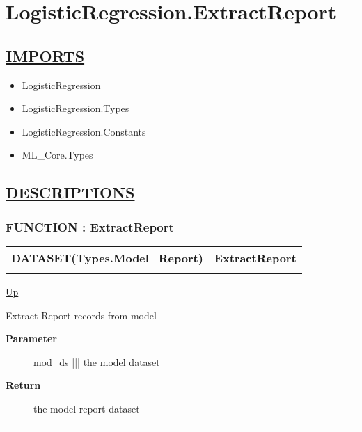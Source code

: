 \chapter*{LogisticRegression.ExtractReport}
\hypertarget{ecldoc:toc:LogisticRegression.ExtractReport}{}

\section*{\underline{IMPORTS}}
\begin{itemize}
\item LogisticRegression
\item LogisticRegression.Types
\item LogisticRegression.Constants
\item ML\_Core.Types
\end{itemize}

\section*{\underline{DESCRIPTIONS}}
\subsection*{FUNCTION : ExtractReport}
\hypertarget{ecldoc:logisticregression.extractreport}{}

{\renewcommand{\arraystretch}{1.5}
\begin{tabularx}{\textwidth}{|>{\raggedright\arraybackslash}l|X|}
\hline
\hspace{0pt}DATASET(Types.Model\_Report) & ExtractReport \\
\hline
\multicolumn{2}{|>{\raggedright\arraybackslash}X|}{\hspace{0pt}(DATASET(Core\_Types.Layout\_Model) mod\_ds)} \\
\hline
\end{tabularx}
}

\hyperlink{ecldoc:toc:LogisticRegression}{Up}

\par
Extract Report records from model

\par
\begin{description}
\item [\textbf{Parameter}] mod\_ds ||| the model dataset
\item [\textbf{Return}] the model report dataset
\end{description}

\rule{\textwidth}{0.4pt}
